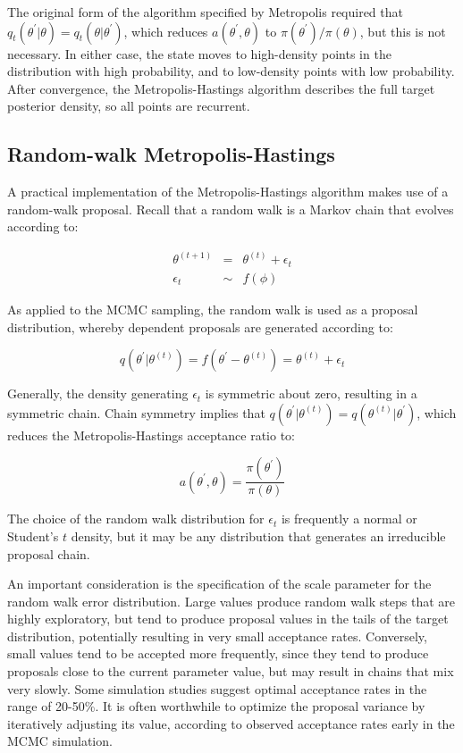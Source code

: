 \noindent The original form of the algorithm specified by Metropolis required that $q_t(\theta^{\prime} | \theta) = q_t(\theta | \theta^{\prime})$, which reduces $a(\theta^{\prime},\theta)$ to $\pi(\theta^{\prime})/\pi(\theta)$, but this is not necessary. In either case, the state moves to high-density points in the distribution with high probability, and to low-density points with low probability. After convergence, the Metropolis-Hastings algorithm describes the full target posterior density, so all points are recurrent.


\hypertarget{random-walk-metropolis-hastings}{}
\subsection*{Random-walk Metropolis-Hastings}

A practical implementation of the Metropolis-Hastings algorithm makes use of a random-walk proposal. Recall that a random walk is a Markov chain that evolves according to:

\begin{eqnarray*}
\theta^{(t+1)} &=& \theta^{(t)} + \epsilon_t \\
\epsilon_t &\sim& f(\phi)
\end{eqnarray*}

As applied to the MCMC sampling, the random walk is used as a proposal distribution, whereby dependent proposals are generated according to:

\[
q(\theta^{\prime} | \theta^{(t)}) = f(\theta^{\prime} - \theta^{(t)}) = \theta^{(t)} + \epsilon_t
\]

Generally, the density generating $\epsilon_t$ is symmetric about zero, resulting in a symmetric chain. Chain symmetry implies that $q(\theta^{\prime} | \theta^{(t)}) = q(\theta^{(t)} | \theta^{\prime})$, which reduces the Metropolis-Hastings acceptance ratio to:

\[
a(\theta^{\prime},\theta) = \frac{\pi(\theta^{\prime})}{\pi(\theta)}
\]

The choice of the random walk distribution for $\epsilon_t$ is frequently a normal or Student's $t$ density, but it may be any distribution that generates an irreducible proposal chain.

An important consideration is the specification of the scale parameter for the random walk error distribution. Large values produce random walk steps that are highly exploratory, but tend to produce proposal values in the tails of the target distribution, potentially resulting in very small acceptance rates. Conversely, small values tend to be accepted more frequently, since they tend to produce proposals close to the current parameter value, but may result in chains that mix very slowly. Some simulation studies suggest optimal acceptance rates in the range of 20-50\%. It is often worthwhile to optimize the proposal variance by iteratively adjusting its value, according to observed acceptance rates early in the MCMC simulation.
